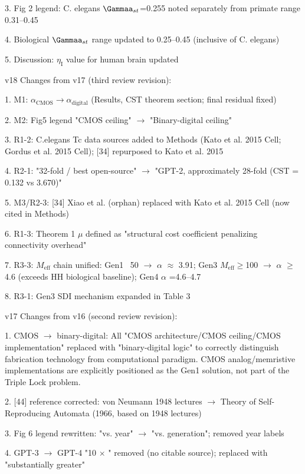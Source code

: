 \documentclass[a4paper,12pt]{article}
\begin{document}
3. Fig 2 legend: C. elegans $\Gammaa_{st}$=0.255 noted separately from primate range 0.31--0.45

4. Biological $\Gammaa_{st}$ range updated to 0.25--0.45 (inclusive of C. elegans)

5. Discussion: $\eta_{\text{I}}$ value for human brain updated

v18 Changes from v17 (third review revision):

1. M1: $\alpha_{\text{CMOS}} \rightarrow \alpha_{\text{digital}}$ (Results, CST theorem section; final residual fixed)

2. M2: Fig5 legend "CMOS ceiling"  $\rightarrow$  "Binary-digital ceiling"

3. R1-2: C.elegans Tc data sources added to Methods (Kato et al. 2015 Cell; Gordus et al. 2015 Cell); [34] repurposed to Kato et al. 2015

4. R2-1: "32-fold / best open-source"  $\rightarrow$  "GPT-2, approximately 28-fold (CST = 0.132 vs 3.670)"

5. M3/R2-3: [34] Xiao et al. (orphan) replaced with Kato et al. 2015 Cell (now cited in Methods)

6. R1-3: Theorem 1  $\mu$  defined as "structural cost coefficient penalizing connectivity overhead"

7. R3-3: $M_{\text{eff}}$ chain unified: Gen1 ~50 $\rightarrow$ $\alpha$ $\approx$ 3.91; Gen3 $M_{\text{eff}}\geq$100 $\rightarrow$ $\alpha$ $\geq$ 4.6 (exceeds HH biological baseline); Gen4  $\alpha$ =4.6--4.7

8. R3-1: Gen3 SDI mechanism expanded in Table 3

v17 Changes from v16 (second review revision):

1. CMOS $\rightarrow$ binary-digital: All "CMOS architecture/CMOS ceiling/CMOS implementation" replaced with "binary-digital logic" to correctly distinguish fabrication technology from computational paradigm. CMOS analog/memristive implementations are explicitly positioned as the Gen1 solution, not part of the Triple Lock problem.

2. [44] reference corrected: von Neumann 1948 lectures  $\rightarrow$  Theory of Self-Reproducing Automata (1966, based on 1948 lectures)

3. Fig 6 legend rewritten: "vs. year"  $\rightarrow$  "vs. generation"; removed year labels

4. GPT-3 $\rightarrow$ GPT-4 "10 $\times$ " removed (no citable source); replaced with "substantially greater"
\end{document}
